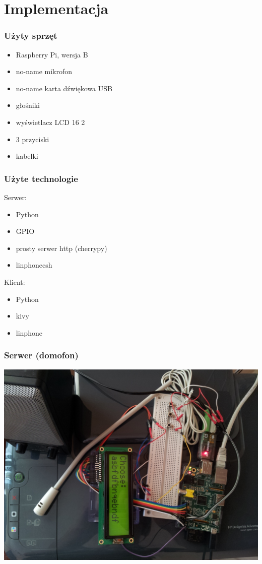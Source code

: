 \documentclass[presentation, 10pt]{beamer}
\begin{document}
\section{Implementacja}
\label{sec-3}
\begin{frame}
\frametitle{Użyty sprzęt}
\label{sec-3-1}

\begin{itemize}
\item Raspberry Pi, wersja B
\item no-name mikrofon
\item no-name karta dźwiękowa USB
\item głośniki
\item wyświetlacz LCD 16 \texttimes{} 2
\item 3 przyciski
\item kabelki
\end{itemize}
\end{frame}
\begin{frame}
\frametitle{Użyte technologie}
\label{sec-3-2}

Serwer:
\begin{itemize}
\item Python
\item GPIO
\item prosty serwer http (cherrypy)
\item linphonecsh
\end{itemize}

Klient:
\begin{itemize}
\item Python
\item kivy
\item linphone
\end{itemize}
\end{frame}
\begin{frame}
\frametitle{Serwer (domofon)}
\label{sec-3-3}

\includegraphics[width=.9\linewidth]{rpi1.jpg}
\end{frame}
\end{document}
